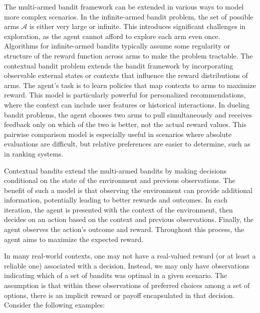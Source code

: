 \documentclass[
  letterpaper,
  numbers=noenddot,
  DIV=11]{scrreprt}
\theoremstyle{definition}
\theoremstyle{plain}
\theoremstyle{plain}
\theoremstyle{remark}
\begin{document}
The multi-armed bandit framework can be extended in various ways to
model more complex scenarios. In the infinite-armed bandit problem, the
set of possible arms \(\mathcal{A}\) is either very large or infinite.
This introduces significant challenges in exploration, as the agent
cannot afford to explore each arm even once. Algorithms for
infinite-armed bandits typically assume some regularity or structure of
the reward function across arms to make the problem tractable. The
contextual bandit problem extends the bandit framework by incorporating
observable external states or contexts that influence the reward
distributions of arms. The agent's task is to learn policies that map
contexts to arms to maximize reward. This model is particularly powerful
for personalized recommendations, where the context can include user
features or historical interactions. In dueling bandit problems, the
agent chooses two arms to pull simultaneously and receives feedback only
on which of the two is better, not the actual reward values. This
pairwise comparison model is especially useful in scenarios where
absolute evaluations are difficult, but relative preferences are easier
to determine, such as in ranking systems.

Contextual bandits extend the multi-armed bandits by making decisions
conditional on the state of the environment and previous observations.
The benefit of such a model is that observing the environment can
provide additional information, potentially leading to better rewards
and outcomes. In each iteration, the agent is presented with the context
of the environment, then decides on an action based on the context and
previous observations. Finally, the agent observes the action's outcome
and reward. Throughout this process, the agent aims to maximize the
expected reward.

In many real-world contexts, one may not have a real-valued reward (or
at least a reliable one) associated with a decision. Instead, we may
only have observations indicating which of a set of bandits was optimal
in a given scenario. The assumption is that within these observations of
preferred choices among a set of options, there is an implicit reward or
payoff encapsulated in that decision. Consider the following examples:
\end{document}
